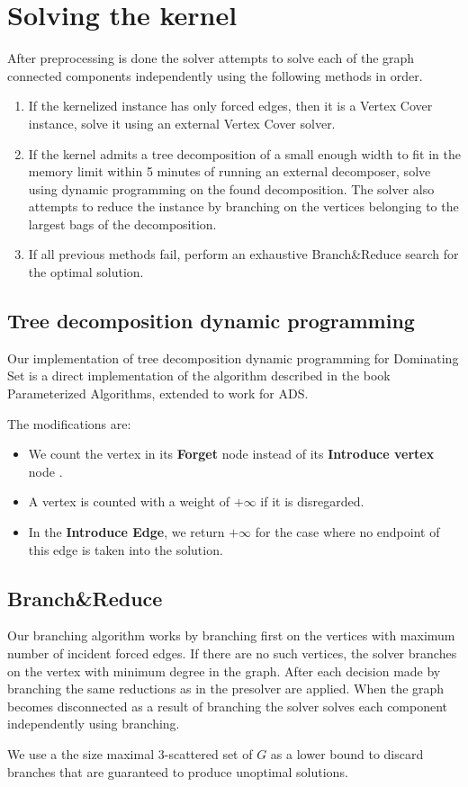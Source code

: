 \documentclass[a4paper,UKenglish,cleveref, autoref, thm-restate]{lipics-v2021}
\begin{document}
\section{Solving the kernel}
After preprocessing is done the solver attempts to solve each of the graph connected components independently using the following methods in order.
\begin{enumerate} 
    \item If the kernelized instance has only forced edges, then it is a Vertex Cover instance, solve it using an external Vertex Cover solver.
    \item If the kernel admits a tree decomposition of a small enough width to fit in the memory limit within 5 minutes of running an external decomposer, solve using dynamic programming on the found decomposition.
    The solver also attempts to reduce the instance by branching on the vertices belonging to the largest bags of the decomposition.
    \item If all previous methods fail, perform an exhaustive Branch\&Reduce search for the optimal solution.
\end{enumerate}

\subsection{Tree decomposition dynamic programming}
Our implementation of tree decomposition dynamic programming for Dominating Set is a direct implementation of the algorithm described in the book Parameterized Algorithms\cite{DBLP:books/sp/CyganFKLMPPS15}, 
extended to work for ADS. 

The modifications are:
\begin{itemize}
    \item We count the vertex in its \textbf{Forget} node instead of its \textbf{Introduce vertex} node .
    \item A vertex is counted with a weight of $+\infty$ if it is disregarded.
    \item In the \textbf{Introduce Edge}, we return $+\infty$ for the case where no endpoint of this edge is taken into the solution.
\end{itemize}


\subsection{Branch\&Reduce}
Our branching algorithm works by branching first on the vertices with maximum number of incident forced edges. 
If there are no such vertices, the solver branches on the vertex with minimum degree in the graph.
After each decision made by branching the same reductions as in the presolver are applied.
When the graph becomes disconnected as a result of branching the solver solves each component independently using branching.

We use a the size maximal $3$-scattered set of $G$ as a lower bound to discard branches that are guaranteed to produce unoptimal solutions. 





\appendix
\end{document}

